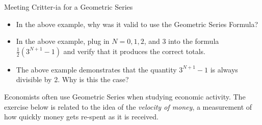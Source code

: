\begin{exercise}{Meeting Critter-ia for a Geometric Series \Coffeecup}
\begin{itemize}
\item In the above example, why was it valid to use the Geometric Series Formula? 
\item In the above example, plug in $N=0,1,2$, and 3 into the formula $\frac{1}{2}\left(3^{N+1}-1\right)$ and verify that it produces the correct totals.
\item The above example demonstrates that the quantity $3^{N+1}-1$ is always divisible by 2.  Why is this the case?
\end{itemize}
\end{exercise}

Economists often use Geometric Series when studying economic activity.  The exercise below is related to the idea of the \emph{velocity of money}, a measurement of how quickly money gets re-spent as it is received.  

